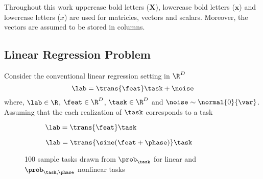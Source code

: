 Throughout this work uppercase bold letters (\eg $\mathbf{X}$), lowercase bold letters (\eg $\mathbf{x}$) and lowercase letters (\eg ${x}$) are used for matricies, vectors and scalars. Moreover, the vectors are assumed to be stored in columns.


\subsection{Linear Regression Problem}

Consider the conventional linear regression setting in $\R^D$
\begin{equation}\label{eq:linearreg}
  \lab = \trans{\feat}\task+\noise
\end{equation}
where, $\lab\in\R$, $\feat\in\R^D$, $\task\in\R^D$ and $\noise\sim\normal{0}{\var}$. Assuming that the each realization of $\task$ corresponds to a task 


\begin{figure}
     \centering
     \begin{subfigure}[b]{0.45\textwidth}
         \centering
        
         \caption{$\lab = \trans{\feat}\task$}
         \label{fig:y equals x}
     \end{subfigure}
     \hfill
     \begin{subfigure}[b]{0.45\textwidth}
         \centering
          
         \caption{$\lab = \trans{\sine(\feat+\phase)}\task$}
         \label{fig:three sin x}
     \end{subfigure}
  \caption{100 sample tasks drawn from $\prob_\task$ for linear and $\prob_{\task,\phase}$ nonlinear tasks}

\end{figure}

